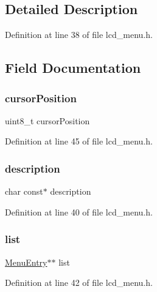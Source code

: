 \subsection{Detailed Description}


Definition at line 38 of file lcd\+\_\+menu.\+h.



\subsection{Field Documentation}
\mbox{\label{struct_menu___a0d0cde5c12c27aa95e12e069cae5bdce}} 
\subsubsection{\texorpdfstring{cursor\+Position}{cursorPosition}}
{\footnotesize\ttfamily uint8\+\_\+t cursor\+Position}



Definition at line 45 of file lcd\+\_\+menu.\+h.

\mbox{\label{struct_menu___af92f126a07a2944ef81db37d6e6e21ae}} 
\subsubsection{\texorpdfstring{description}{description}}
{\footnotesize\ttfamily char const$\ast$ description}



Definition at line 40 of file lcd\+\_\+menu.\+h.

\mbox{\label{struct_menu___af3f1ad2de60356d88ae4151e60a87260}} 
\subsubsection{\texorpdfstring{list}{list}}
{\footnotesize\ttfamily \mbox{\hyperlink{lcd__menu_8h_a5562b957d336dc1492f008e49dac5f5d}{Menu\+Entry}}$\ast$$\ast$ list}



Definition at line 42 of file lcd\+\_\+menu.\+h.

